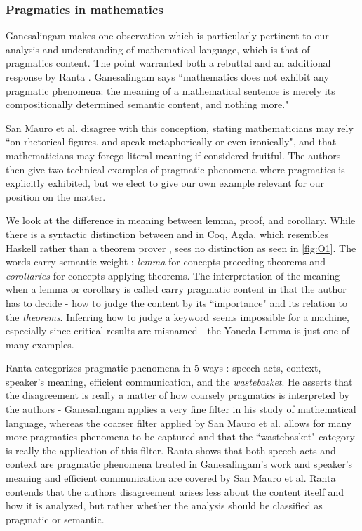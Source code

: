 \subsubsection{Pragmatics in mathematics}

Ganesalingam makes one observation which is particularly pertinent to our
analysis and understanding of mathematical language, which is that of pragmatics
content. The point warranted both a rebuttal \cite{RUFFINO2020114} and an
additional response by Ranta \cite{RANTA2020120}. Ganesalingam says
``mathematics does not exhibit any pragmatic phenomena: the meaning of a
mathematical sentence is merely its compositionally determined semantic content,
and nothing more."

San Mauro et al. disagree with this conception, stating mathematicians may rely
``on rhetorical figures, and speak metaphorically or even ironically", and that
mathematicians may forego literal meaning if considered fruitful. The authors
then give two technical examples of pragmatic phenomena where pragmatics is
explicitly exhibited, but we elect to give our own example relevant for our position on
the matter.

We look at the difference in meaning between lemma, proof, and corollary. While
there is a syntactic distinction between  and  in Coq,
Agda, which resembles Haskell rather than a theorem prover , sees no distinction
as seen in \autoref{fig:O1}. The words carry semantic weight : \emph{lemma} for
concepts preceding theorems and \emph{corollaries} for concepts applying
theorems. The interpretation of the meaning when a lemma or corollary is called
carry pragmatic content in that the author has to decide - how to judge the
content by its ``importance" and its relation to the \emph{theorems}. Inferring
how to judge a keyword seems impossible for a machine, especially since critical
results are misnamed - the Yoneda Lemma is just one of many examples.

Ranta categorizes pragmatic phenomena in 5 ways : speech acts, context,
speaker's meaning, efficient communication, and the \emph{wastebasket}. He
asserts that the disagreement is really a matter of how coarsely pragmatics is
interpreted by the authors - Ganesalingam applies a very fine filter in his
study of mathematical language, whereas the coarser filter applied by San Mauro
et al. allows for many more pragmatics phenomena to be captured and that the
``wastebasket" category is really the application of this filter. Ranta shows
that both speech acts and context are pragmatic phenomena treated in
Ganesalingam's work and speaker's meaning and efficient communication are
covered by San Mauro et al. Ranta contends that the authors disagreement arises
less about the content itself and how it is analyzed, but rather whether the
analysis should be classified as pragmatic or semantic.

